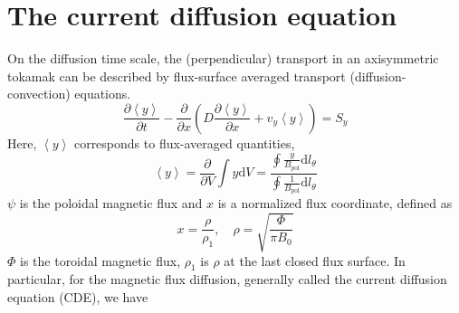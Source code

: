\section{The current diffusion equation}

On the diffusion time scale, the (perpendicular) transport in an axisymmetric tokamak can be described by flux-surface averaged transport (diffusion-convection) equations.
\begin{equation}
\frac{{\partial \left\langle y \right\rangle }}{{\partial t}} - \frac{\partial }{{\partial x}}\left( {D\frac{{\partial \left\langle y \right\rangle }}{{\partial x}} + {v_y}\left\langle y \right\rangle } \right) = {S_y}
\end{equation}
Here, $\left\langle y \right\rangle$ corresponds to flux-averaged quantities,
\begin{equation}
\left\langle y \right\rangle  = \frac{\partial }{{\partial V}}\int {y{\text{d}}V}  = \frac{{\oint {\frac{y}{{{B_{{\text{pol}}}}}}{\text{d}}{l_\theta }} }}{{\oint {\frac{1}{{{B_{{\text{pol}}}}}}{\text{d}}{l_\theta }} }}
\end{equation}
$\psi$ is the poloidal magnetic flux and $x$ is a normalized flux coordinate, defined as
\begin{equation}
x = \frac{\rho }{{{\rho _{{\text{1}}}}}},\quad \rho  = \sqrt {\frac{\Phi }{{\pi {B_0}}}} 
\end{equation}
$\Phi$ is the toroidal magnetic flux, $\rho_1$ is $\rho$ at the last closed flux surface.
In particular, for the magnetic flux diffusion, generally called
the current diffusion equation (CDE), we have \cite{CRONOSref}
